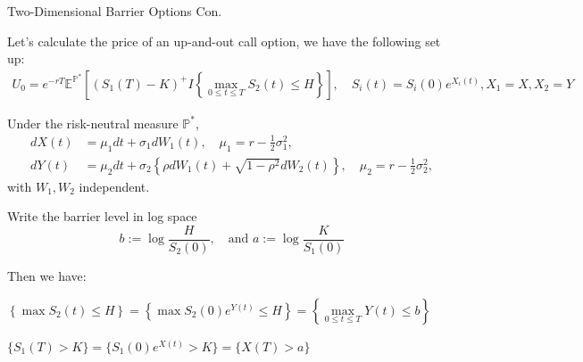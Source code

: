 \documentclass{beamer}
\begin{document}
\begin{frame}{Two-Dimensional Barrier Options Con.}

    {\footnotesize \footnotesize
    \par Let's calculate the price of an up-and-out call option, we have the following set up:
    {\footnotesize \scriptsize
    \begin{align*}
        U_0 = e^{-rT} \mathbb{E}^{\mathbb{P}^*}\left[ (S_1(T) - K)^+ 
       I{\left\{ \max_{0 \leq t \leq T} S_2(t) \leq H \right\}} \right], \quad S_i(t) = S_i(0)e^{X_i(t)}, X_1 
        = X,  X_2 = Y
    \end{align*}
    }
    \par Under the risk-neutral measure \(\mathbb{P}^*\),
    {\footnotesize \scriptsize
    \begin{align*}
    dX(t) &= \mu_1 dt + \sigma_1 dW_1(t), \quad \mu_1 = r - \frac{1}{2} \sigma_1^2, \\
    dY(t) &= \mu_2 dt + \sigma_2 \left\{\rho dW_1(t) + \sqrt{1 - \rho^2} dW_2(t)\right\}, \quad \mu_2 = r - \frac{1}{2} \sigma_2^2,
    \end{align*}
    }
    with \(W_1, W_2\) independent.
    \par Write the barrier level in log space
    \[
    b := \log \frac{H}{S_2(0)}, \quad \text{and } a := \log \frac{K}{S_1(0)}
    \]
    \par Then we have:\\
    {\footnotesize \scriptsize
    \begin{center}
        $\left\{ \max S_2(t) \leq H \right\} = \left\{ \max S_2(0)e^{Y(t)} \leq H \right\}
         = \left\{ \max\limits_{0 \leq t \leq T} Y(t) \leq b \right\}$
    \end{center}
     \begin{center}
        $\{S_1(T) > K\} = \{S_1(0)e^{X(t)} > K\} = \{X(T) > a\}$
    \end{center}
    }
    
    }
    
\end{frame}
\end{document}

